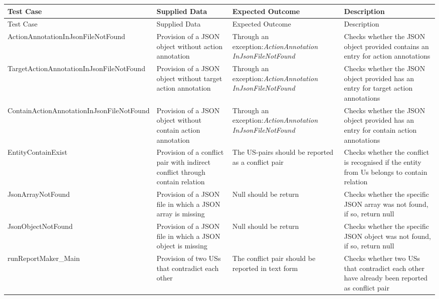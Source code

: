 \begin{tabularx}{\textwidth}{X  X  X  X}
	\hline
	Test Case &Supplied Data&Expected Outcome&Description\\
	\hline\hline
	\endfirsthead
	\hline
	Test Case &Supplied Data&Expected Outcome&Description\\
	\hline\hline
	\endhead
	
	ActionAnnotation\newline InJsonFileNotFound&Provision of a JSON object without action annotation&Through an exception:\textit{ActionAnnotation InJsonFileNotFound}&Checks whether the JSON object provided contains an entry for action annotations\\
	
	TargetActionAnnotation\newline InJsonFileNotFound&Provision of a JSON object without target action annotation&Through an exception:\textit{ActionAnnotation InJsonFileNotFound}&Checks whether the JSON object provided has an entry for target action annotations\\
	
	ContainActionAnnotation\newline InJsonFileNotFound&Provision of a JSON object without contain action annotation&Through an exception:\textit{ActionAnnotation InJsonFileNotFound}&Checks whether the JSON object provided has an entry for contain action annotations\\
	
	EntityContainExist&Provision of a conflict pair with indirect conflict through contain relation&The US-pairs should be reported as a conflict pair&Checks whether the conflict is recognised if the entity from Us belongs to contain relation\\
	
	JsonArrayNotFound&Provision of a JSON file in which a JSON array is missing&Null should be return&Checks whether the specific JSON array was not found, if so, return null\\
	
	JsonObjectNotFound&Provision of a JSON file in which a JSON object is missing&Null should be return&Checks whether the specific JSON object was not found, if so, return null\\
	
	runReportMaker\_Main&Provision of two USs that contradict each other&The conflict pair should be reported in text form&Checks whether two USs that contradict each other have already been reported as conflict pair\\
	

\end{tabularx}
